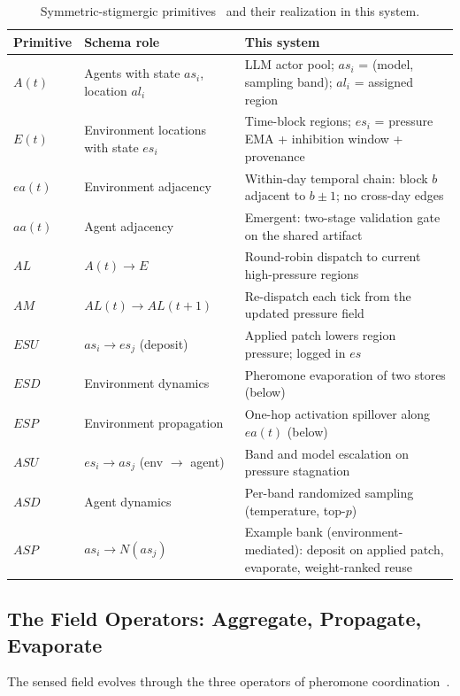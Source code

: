 \begin{table}[htbp]
\centering
\caption{Symmetric-stigmergic primitives~\cite{parunak2025insects} and their realization in this system.}
\label{tab:stigmergy-mapping}
\begin{tabularx}{\textwidth}{@{}l >{\raggedright\arraybackslash}X >{\raggedright\arraybackslash}X@{}}
\toprule
Primitive & Schema role & This system \\
\midrule
$A(t)$ & Agents with state $as_i$, location $al_i$ & LLM actor pool; $as_i$ = (model, sampling band); $al_i$ = assigned region \\
$E(t)$ & Environment locations with state $es_i$ & Time-block regions; $es_i$ = pressure EMA + inhibition window + provenance \\
$ea(t)$ & Environment adjacency & Within-day temporal chain: block $b$ adjacent to $b{\pm}1$; no cross-day edges \\
$aa(t)$ & Agent adjacency & Emergent: two-stage validation gate on the shared artifact \\
$AL$ & $A(t) \to E$ & Round-robin dispatch to current high-pressure regions \\
$AM$ & $AL(t) \to AL(t{+}1)$ & Re-dispatch each tick from the updated pressure field \\
$ESU$ & $as_i \to es_j$ (deposit) & Applied patch lowers region pressure; logged in $es$ \\
$ESD$ & Environment dynamics & Pheromone evaporation of two stores (below) \\
$ESP$ & Environment propagation & One-hop activation spillover along $ea(t)$ (below) \\
$ASU$ & $es_i \to as_j$ (env $\to$ agent) & Band and model escalation on pressure stagnation \\
$ASD$ & Agent dynamics & Per-band randomized sampling (temperature, top-$p$) \\
$ASP$ & $as_i \to N(as_j)$ & Example bank (environment-mediated): deposit on applied patch, evaporate, weight-ranked reuse \\
\bottomrule
\end{tabularx}
\end{table}

\subsection{The Field Operators: Aggregate, Propagate, Evaporate}

The sensed field evolves through the three operators of pheromone coordination~\cite{parunak2011mean}.

